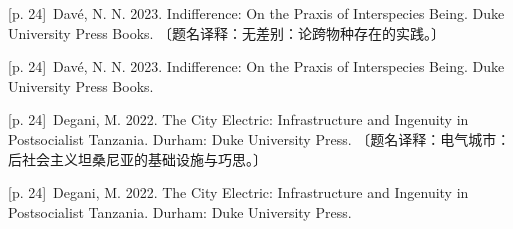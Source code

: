 \documentclass[10pt,a4paper]{article}
\begin{document}
\noindent\begin{minipage}{\textwidth}\begin{minipage}[t]{\dimexpr.5\textwidth-4mm\relax}\noindent\begin{minipage}[t]{\linewidth}{\scriptsize\color{gray} [p. 24]}\ Davé, N. N. 2023. Indifference: On the Praxis of Interspecies Being. Duke University Press Books. 〔题名译释：无差别：论跨物种存在的实践。〕\par\end{minipage}\par\end{minipage}\hfill\begin{minipage}[t]{\dimexpr.5\textwidth-4mm\relax}\noindent\begin{minipage}[t]{\linewidth}{\scriptsize\color{gray} [p. 24]}\ Davé, N. N. 2023. Indifference: On the Praxis of Interspecies Being. Duke University Press Books.\par\end{minipage}\par\end{minipage}\end{minipage}\par
\noindent\begin{minipage}{\textwidth}\begin{minipage}[t]{\dimexpr.5\textwidth-4mm\relax}\noindent\begin{minipage}[t]{\linewidth}{\scriptsize\color{gray} [p. 24]}\ Degani, M. 2022. The City Electric: Infrastructure and Ingenuity in Postsocialist Tanzania. Durham: Duke University Press. 〔题名译释：电气城市：后社会主义坦桑尼亚的基础设施与巧思。〕\par\end{minipage}\par\end{minipage}\hfill\begin{minipage}[t]{\dimexpr.5\textwidth-4mm\relax}\noindent\begin{minipage}[t]{\linewidth}{\scriptsize\color{gray} [p. 24]}\ Degani, M. 2022. The City Electric: Infrastructure and Ingenuity in Postsocialist Tanzania. Durham: Duke University Press.\par\end{minipage}\par\end{minipage}\end{minipage}\par
\end{document}
